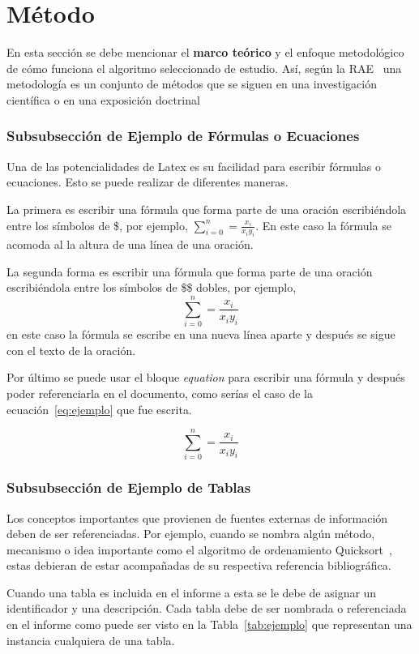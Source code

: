 \documentclass[journal]{IEEEtran}
\begin{document}
\section{Método} \label{sec:método}
En esta sección se debe mencionar el \textbf{marco teórico} y el enfoque metodológico de cómo funciona el algoritmo seleccionado de estudio. Así, según la RAE~\cite{Rae2001} una metodología es un conjunto de métodos que se siguen en una investigación científica o en una exposición doctrinal

\subsubsection{Subsubsección de Ejemplo de Fórmulas o Ecuaciones}
Una de las potencialidades de Latex es su facilidad para escribir fórmulas o ecuaciones. Esto se puede realizar de diferentes maneras.

La primera es escribir una fórmula que forma parte de una oración escribiéndola entre los símbolos de \$, por ejemplo, $\sum_{i=0}^{n}=\frac{x_i}{x_iy_i}$. En este caso la fórmula se acomoda al la altura de una línea de una oración.

La segunda forma es escribir una fórmula que forma parte de una oración escribiéndola entre los símbolos de \$\$ dobles, por ejemplo, $$\sum_{i=0}^{n}=\frac{x_i}{x_iy_i}$$ en este caso la fórmula se escribe en una nueva línea aparte y después se sigue con el texto de la oración.

Por último se puede usar el bloque \emph{equation} para escribir una fórmula y después poder referenciarla en el documento, como serías el caso de la ecuación~\ref{eq:ejemplo} que fue escrita.

\begin{equation}
    \sum_{i=0}^{n}=\frac{x_i}{x_iy_i}
    \label{eq:ejemplo}
\end{equation}

\subsubsection{Subsubsección de Ejemplo de Tablas}
Los conceptos importantes que provienen de fuentes externas de información deben de ser referenciadas. Por ejemplo, cuando se nombra algún método, mecanismo o idea importante como el algoritmo de ordenamiento Quicksort~\cite{Hoare1962}, estas debieran de estar acompañadas de su respectiva referencia bibliográfica. 

Cuando una tabla es incluida en el informe a esta se le debe de asignar un identificador y una descripción. Cada tabla debe de ser nombrada o referenciada en el informe como puede ser visto en la Tabla~\ref{tab:ejemplo} que representan una instancia cualquiera de una tabla.
\end{document}
